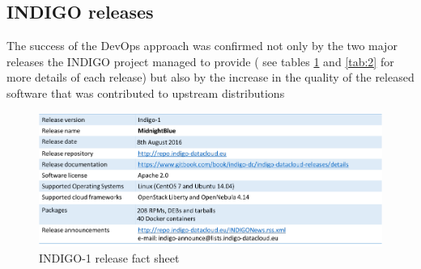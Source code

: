 \documentclass{article}
\begin{document}

 \subsection{INDIGO releases}

The success of the DevOps approach was confirmed not only by the two major releases the INDIGO project managed to provide ( see tables  \ref{tab:1} and  \ref{tab:2} for more details of each release) but also by the increase in the quality of the released software that was contributed to upstream distributions





\begin{figure}
  \centering
  \includegraphics[width=\textwidth]{./figs/TableI.pdf}
  \caption{INDIGO-1 release fact sheet}
  \label{tab:1}
\end{figure}
\end{document}

